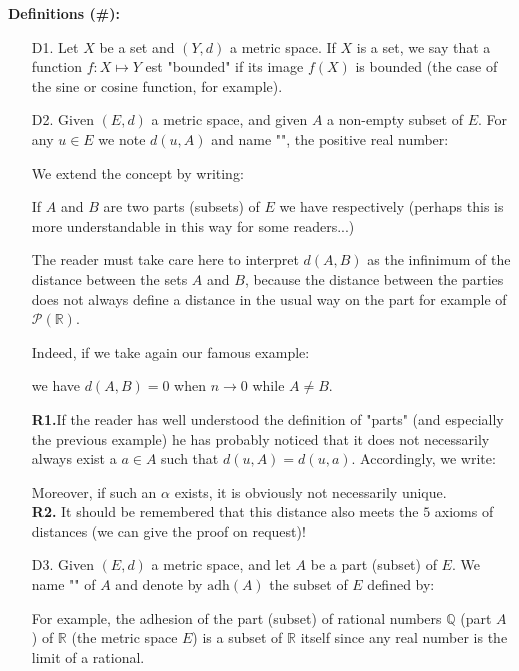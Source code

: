 	\textbf{Definitions (\#\mydef):}
	\begin{enumerate}
		\item[D1.] Let $X$ be a set and $(Y,d)$ a metric space. If $X$ is a set, we say that a function $f: X\mapsto Y$ est "bounded" if its image $f (X)$ is bounded (the case of the sine or cosine function, for example).
		
		\item[D2.] Given $(E, d)$ a metric space, and given $A$ a non-empty subset of $E$. For any $u\in E$ we note $d(u, A)$ and name "", the positive real number:
		
		We extend the concept by writing:
		
		If $A$ and $B$ are two parts (subsets) of $E$ we have respectively (perhaps this is more understandable in this way for some readers...)
		
		The reader must take care here to interpret $d(A,B)$ as the infinimum of the distance between the sets $A$ and $B$, because the distance between the parties does not always define a distance in the usual way on the part for example of $\mathcal{P}(\mathbb{R})$.
		
		Indeed, if we take again our famous example:
			
	 	we have $d(A,B)=0$ when $n \rightarrow 0$ while $A\neq B$.
	 	\begin{tcolorbox}[title=Remarks,colframe=black,arc=10pt]
		\textbf{R1.}If the reader has well understood the definition of "parts" (and especially the previous example) he has probably noticed that it does not necessarily always exist a $a\in A$ such that $d(u,A)=d(u,a)$. Accordingly, we write:
		
		Moreover, if such an $\alpha$ exists, it is obviously not necessarily unique.\\
		
		\textbf{R2.} It should be remembered that this distance also meets the $5$ axioms of distances (we can give the proof on request)!
		\end{tcolorbox}	
	
		\item[D3.] Given $(E, d)$ a metric space, and let $A$ be a part (subset) of $E$. We name "" of $A$ and denote by $\text{adh} (A)$ the subset of $E$ defined by:
		
		For example, the adhesion of the part (subset) of rational numbers $\mathbb{Q}$ (part $A$) of $\mathbb{R}$  (the metric space $E$) is a subset of $\mathbb{R}$ itself since any real number is the limit of a rational.
		

\end{enumerate}
